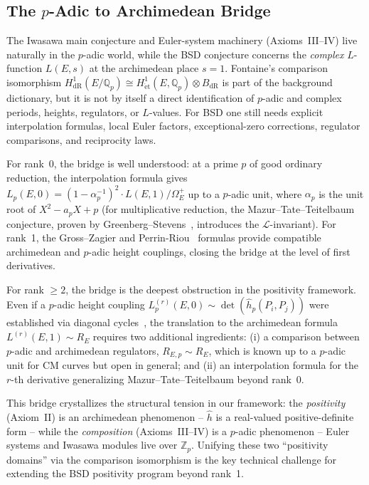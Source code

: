 \documentclass[aps,prd,twocolumn,superscriptaddress,nofootinbib,floatfix]{revtex4-2}
\theoremstyle{definition}
\theoremstyle{remark}
\begin{document}
\subsection{\texorpdfstring{The $p$-Adic to Archimedean Bridge}{The p-Adic to Archimedean Bridge}}
\label{sec:p-adic-bridge}

The Iwasawa main conjecture and Euler-system machinery (Axioms~III--IV) live naturally in the $p$-adic world, while the BSD conjecture concerns the \textit{complex} $L$-function $L(E,s)$ at the archimedean place $s = 1$. Fontaine's comparison isomorphism $H^1_{\mathrm{dR}}(E/\mathbb{Q}_p) \cong H^1_{\mathrm{\acute{e}t}}(E, \mathbb{Q}_p) \otimes B_{\mathrm{dR}}$ is part of the background dictionary, but it is not by itself a direct identification of $p$-adic and complex periods, heights, regulators, or $L$-values. For BSD one still needs explicit interpolation formulas, local Euler factors, exceptional-zero corrections, regulator comparisons, and reciprocity laws.

For rank~0, the bridge is well understood: at a prime $p$ of good ordinary reduction, the interpolation formula gives $L_p(E,0) = (1 - \alpha_p^{-1})^2 \cdot L(E,1)/\Omega_E^+$ up to a $p$-adic unit, where $\alpha_p$ is the unit root of $X^2 - a_p X + p$ (for multiplicative reduction, the Mazur--Tate--Teitelbaum conjecture, proven by Greenberg--Stevens~\cite{GreenbergStevens1993}, introduces the $\mathcal{L}$-invariant). For rank~1, the Gross--Zagier and Perrin-Riou~\cite{PerrinRiou1987} formulas provide compatible archimedean and $p$-adic height couplings, closing the bridge at the level of first derivatives.

For rank $\geq 2$, the bridge is the deepest obstruction in the positivity framework. Even if a $p$-adic height coupling $L_p^{(r)}(E,0) \sim \det(\hat{h}_p(P_i, P_j))$ were established via diagonal cycles~\cite{DarmonRotger2017}, the translation to the archimedean formula $L^{(r)}(E,1) \sim R_E$ requires two additional ingredients: (i) a comparison between $p$-adic and archimedean regulators, $R_{E,p} \sim R_E$, which is known up to a $p$-adic unit for CM curves but open in general; and (ii) an interpolation formula for the $r$-th derivative generalizing Mazur--Tate--Teitelbaum beyond rank~0.

This bridge crystallizes the structural tension in our framework: the \textit{positivity} (Axiom~II) is an archimedean phenomenon -- $\hat{h}$ is a real-valued positive-definite form -- while the \textit{composition} (Axioms~III--IV) is a $p$-adic phenomenon -- Euler systems and Iwasawa modules live over $\mathbb{Z}_p$. Unifying these two ``positivity domains'' via the comparison isomorphism is the key technical challenge for extending the BSD positivity program beyond rank~1.
\end{document}
